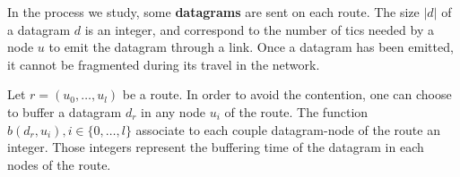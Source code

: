 \documentclass[french]{article}
\begin{document}
        In the process we study, some {\bf datagrams} are sent on each route. The size $|d|$ of a datagram $d$ is an integer, and correspond to the number of tics needed by a node $u$ to emit the datagram through a link. Once a datagram has been emitted, it cannot be fragmented during its travel in the network.
        
   
        
          Let $r=(u_0,\dots,u_l)$ be a route. In order to avoid the contention, one can choose to buffer a datagram $d_r$ in any node $u_i$ of the route. The function $b(d_r,u_i), i \in \{0,\ldots,l\}$ associate to each couple datagram-node of the route an integer. Those integers represent the buffering time of the datagram in each nodes of the route.
              
\end{document}
